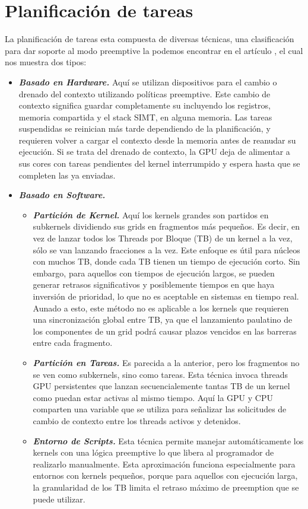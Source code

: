 
\section{Planificación de tareas}

La planificación de tareas esta compuesta de diversas técnicas, una clasificación para dar soporte al modo preemptive la podemos encontrar en el artículo \cite{GPUArt}, el cual nos muestra dos tipos:

\begin{itemize}
\item \textbf{\textit{Basado en Hardware.}} 
	Aquí se utilizan dispositivos para el cambio o drenado del contexto utilizando políticas preemptive. Este cambio de contexto significa guardar completamente su incluyendo los registros, memoria compartida y el stack SIMT, en alguna memoria. Las tareas suspendidas se reinician más tarde dependiendo de la planificación, y requieren volver a cargar el contexto desde la memoria antes de reanudar su ejecución. Si se trata del drenado de contexto, la GPU deja de alimentar a sus cores con tareas pendientes del kernel interrumpido y espera hasta que se completen las ya enviadas.
	
\item \textbf{\textit{Basado en Software.}}
	\begin{itemize}
	\item \textbf{\textit{Partición de Kernel.}}
		Aquí los kernels grandes son partidos en subkernels dividiendo sus grids en fragmentos más pequeños. Es decir, en vez de lanzar todos los Threads por Bloque (TB) de un kernel a la vez, sólo se van lanzando fracciones a la vez. Este enfoque es útil para núcleos con muchos TB, donde cada TB tienen un tiempo de ejecución corto. Sin embargo, para aquellos con tiempos de ejecución largos, se pueden generar retrasos significativos y posiblemente tiempos en que haya inversión de prioridad, lo que no es aceptable en sistemas en tiempo real. Aunado a esto, este método no es aplicable a los kernels que requieren una sincronización global entre TB, ya que el lanzamiento paulatino de los componentes de un grid podrá causar plazos vencidos en las barreras entre cada fragmento.
	\item \textbf{\textit{Partición en Tareas.}}
		Es parecida a la anterior, pero los fragmentos no se ven como subkernels, sino como tareas. Esta técnica invoca threads GPU persistentes que lanzan secuencialemente tantas TB de un kernel como puedan estar activas al mismo tiempo. Aquí la GPU y CPU comparten una variable que se utiliza para señalizar las solicitudes de cambio de contexto entre los threads activos y detenidos.
	\item \textbf{\textit{Entorno de Scripts.}}	
		Esta técnica permite manejar automáticamente los kernels con una lógica preemptive lo que libera al programador de realizarlo manualmente. Esta aproximación funciona especialmente para entornos con kernels pequeños, porque para aquellos con ejecución larga, la granularidad de los TB limita el retraso máximo de preemption que se puede utilizar.
	\end {itemize}
\end {itemize}

